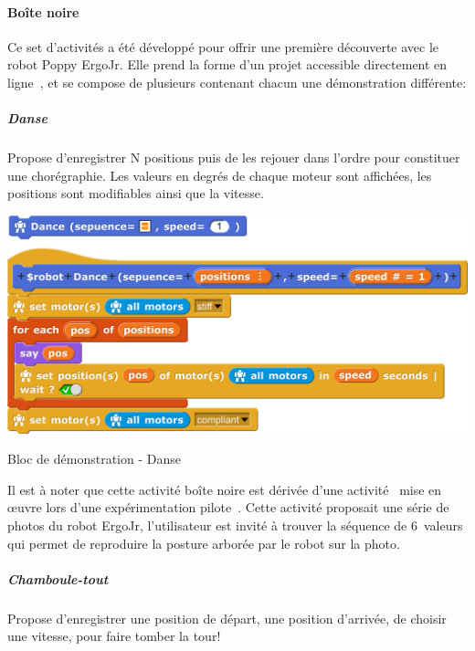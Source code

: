             \paragraph{Boîte noire}
                Ce set d'activités a été développé pour offrir une première découverte avec le robot Poppy ErgoJr. Elle prend la forme d'un projet  accessible directement en ligne~, et se compose de plusieurs   contenant chacun une démonstration différente:
                \subparagraph{Danse}
                    Propose d'enregistrer N positions puis de les rejouer dans l'ordre pour constituer une chorégraphie. Les valeurs en degrés de chaque moteur sont affichées, les positions sont modifiables ainsi que la vitesse.
                    \begin{code}[!h]                        \label{cod:prog_dance}\includegraphics[width=0.9\linewidth]{Figures/prog-dance.png}
                        \caption{Bloc de démonstration - Danse}
                    \end{code}
                    Il est à noter que cette activité boîte noire est dérivée d'une activité~ mise en œuvre lors d'une expérimentation pilote~. Cette activité proposait une série de photos du robot ErgoJr, l'utilisateur est invité à trouver la séquence de 6~valeurs qui permet de reproduire la posture arborée par le robot sur la photo.                \subparagraph{Chamboule-tout}
                    Propose d'enregistrer une position de départ, une position d'arrivée, de choisir une vitesse, pour faire tomber la tour!
